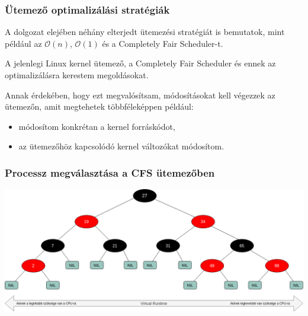 \documentclass{beamer}
\begin{document}
\begin{frame}
\frametitle{Ütemező optimalizálási stratégiák}
A dolgozat elejében néhány elterjedt ütemezési stratégiát is bemutatok, mint például az $\mathcal{O}(n)$, $\mathcal{O}(1)$ és a Completely Fair Scheduler-t.

\bigskip

A jelenlegi Linux kernel ütemező, a Completely Fair Scheduler és ennek az optimalizálásra kerestem megoldásokat.

\bigskip

Annak érdekében, hogy ezt megvalósítsam, módosításokat kell végezzek az ütemezőn, amit megtehetek többféleképpen például:
\begin{itemize}

\item módosítom konkrétan a kernel forráskódot,

\item az ütemezőhöz kapcsolódó kernel változókat módosítom.
\end{itemize}
\end{frame}

\begin{frame}
\frametitle{Processz megválasztása a CFS ütemezőben}
\begin{center}
\includegraphics[width=\textwidth]{./images/redBlackTree.png}
\end{center}
\end{frame}
\end{document}
